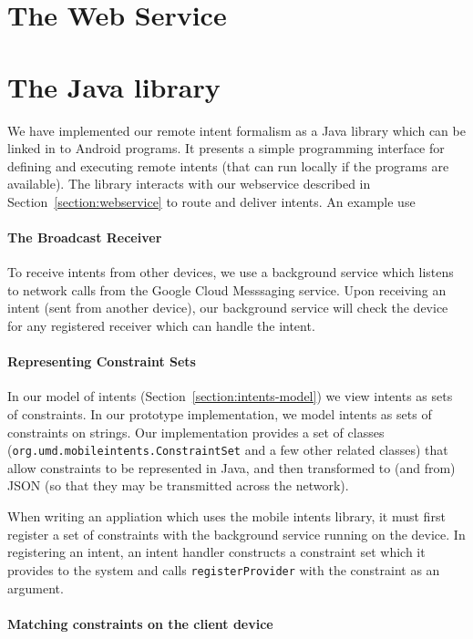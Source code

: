 \documentclass{acm_proc_article-sp}
\begin{document}
\section{The Web Service}



\section{The Java library}

We have implemented our remote intent formalism as a Java library
which can be linked in to Android programs.  It presents a simple
programming interface for defining and executing remote intents (that
can run locally if the programs are available).  The library interacts
with our webservice described in Section~\ref{section:webservice} to
route and deliver intents.  An example use 

\paragraph{The Broadcast Receiver}
To receive intents from other devices, we use a background service
which listens to network calls from the Google Cloud Messsaging
service.  Upon receiving an intent (sent from another device), our
background service will check the device for any registered receiver
which can handle the intent.

\paragraph{Representing Constraint Sets}

In our model of intents (Section~\ref{section:intents-model}) we view
intents as sets of constraints.  In our prototype implementation, we
model intents as sets of constraints on strings.  Our implementation
provides a set of classes
(\texttt{org.umd.mobileintents.ConstraintSet} and a few other related
classes) that allow constraints to be represented in Java, and then
transformed to (and from) JSON (so that they may be transmitted across
the network).

When writing an appliation which uses the mobile intents library, it
must first register a set of constraints with the background service
running on the device.  In registering an intent, an intent handler
constructs a constraint set which it provides to the system and calls
\texttt{registerProvider} with the constraint as an argument.

\paragraph{Matching constraints on the client device}
\end{document}
